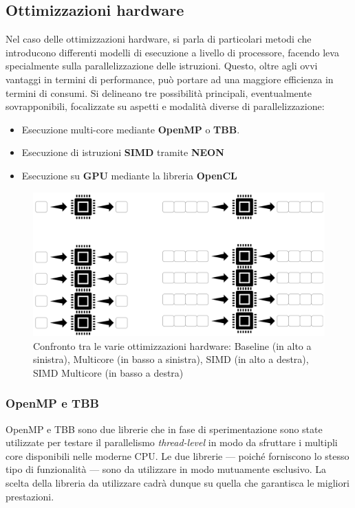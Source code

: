 \subsection{Ottimizzazioni hardware}

Nel caso delle ottimizzazioni hardware, si parla di particolari metodi che introducono differenti modelli di esecuzione
a livello di processore, facendo leva specialmente sulla parallelizzazione delle istruzioni. Questo, oltre agli ovvi vantaggi
in termini di performance, può portare ad una maggiore efficienza in termini di consumi.
Si delineano tre possibilità principali, eventualmente sovrapponibili, focalizzate su aspetti e modalità diverse di 
parallelizzazione:
\begin{itemize}
    \item Esecuzione multi-core mediante \textbf{OpenMP} o \textbf{TBB}. 
    \item Esecuzione di istruzioni \textbf{SIMD} tramite \textbf{NEON}
    \item Esecuzione su \textbf{GPU} mediante la libreria \textbf{OpenCL}
\end{itemize}

\begin{figure}[h!]
    \begin{center}
        \includegraphics[scale=0.1]{img/ottimizzazioni.png}
        \caption{Confronto tra le varie ottimizzazioni hardware: Baseline (in alto a sinistra), Multicore (in basso a sinistra),
        SIMD (in alto a destra), SIMD Multicore (in basso a destra)}
    \end{center}
\end{figure}

\subsubsection{OpenMP e TBB}

OpenMP e TBB sono due librerie che in fase di sperimentazione sono state utilizzate per testare il parallelismo
\emph{thread-level} in modo da sfruttare i multipli core disponibili nelle moderne CPU. Le due librerie --- poiché
forniscono lo stesso tipo di funzionalità --- sono da utilizzare in modo mutuamente esclusivo. La scelta della 
libreria da utilizzare cadrà dunque su quella che garantisca le migliori prestazioni.

